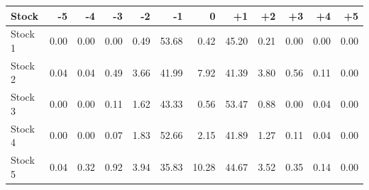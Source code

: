 \begin{tabular}{lrrrrrrrrrrr}
\toprule
Stock & -5 & -4 & -3 & -2 & -1 & 0 & +1 & +2 & +3 & +4 & +5 \\
\midrule
Stock 1 & 0.00 & 0.00 & 0.00 & 0.49 & 53.68 & 0.42 & 45.20 & 0.21 & 0.00 & 0.00 & 0.00 \\
Stock 2 & 0.04 & 0.04 & 0.49 & 3.66 & 41.99 & 7.92 & 41.39 & 3.80 & 0.56 & 0.11 & 0.00 \\
Stock 3 & 0.00 & 0.00 & 0.11 & 1.62 & 43.33 & 0.56 & 53.47 & 0.88 & 0.00 & 0.04 & 0.00 \\
Stock 4 & 0.00 & 0.00 & 0.07 & 1.83 & 52.66 & 2.15 & 41.89 & 1.27 & 0.11 & 0.04 & 0.00 \\
Stock 5 & 0.04 & 0.32 & 0.92 & 3.94 & 35.83 & 10.28 & 44.67 & 3.52 & 0.35 & 0.14 & 0.00 \\
\bottomrule
\end{tabular}
